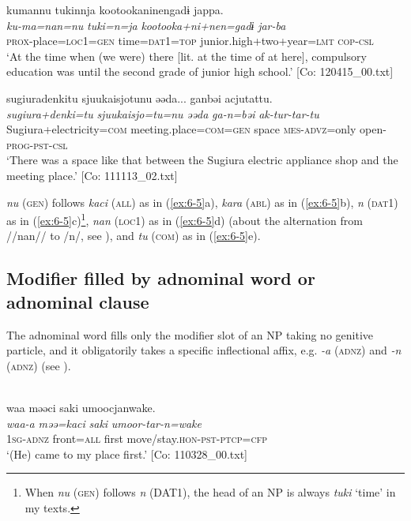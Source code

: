 \ex
{\TM}
\glll kumannu  tukinnja  {\textbar}kootookaninen{\textbar}gadɨ jappa.\\
\textit{ku-ma=nan=nu}  \textit{tuki=n=ja}  \textit{kootooka+ni+nen=gadɨ}   \textit{jar-ba}\\
\textsc{prox}-place=\textsc{loc1}=\textsc{gen}  time=\textsc{dat}1=\textsc{top}  junior.high+two+year=\textsc{lmt}   \textsc{cop}-\textsc{csl}\\
\glt ‘At the time when (we were) there [lit. at the time of at here], compulsory education was until the second grade of junior high school.’ [Co: 120415\_00.txt]

\ex
{\TM}
\glll {\textbar}sugiuradenki{\textbar}tu  {\textbar}sjuukaisjo{\textbar}tunu  əəda...  ganbəi  acjutattu.\\
\textit{sugiura+denki=tu}  \textit{sjuukaisjo=tu=nu}  \textit{əəda}  \textit{ga-n=bəi}  \textit{ak-tur-tar-tu}\\
Sugiura+electricity=\textsc{com}  meeting.place=\textsc{com}=\textsc{gen}  space  \textsc{mes}-\textsc{advz}=only   open-\textsc{prog}-\textsc{pst}-\textsc{csl}\\
\glt ‘There was a space like that between the Sugiura electric appliance shop and the meeting place.’ [Co: 111113\_02.txt]
\z
\z

\textit{nu} (\textsc{gen}) follows \textit{kaci} (\textsc{all}) as in (\ref{ex:6-5}a), \textit{kara} (\textsc{abl}) as in (\ref{ex:6-5}b), \textit{n} (\textsc{dat}1) as in (\ref{ex:6-5}c)\footnote{When \textit{nu} (\textsc{gen}) follows \textit{n} (DAT1), the head of an NP is always \textit{tuki} ‘time’ in my texts.}, \textit{nan} (\textsc{loc1}) as in (\ref{ex:6-5}d) (about the alternation from //nan// to /n/, see ), and \textit{tu} (\textsc{com}) as in (\ref{ex:6-5}e).

\subsection{Modifier filled by adnominal word or adnominal clause}

The adnominal word fills only the modifier slot of an NP taking no genitive particle, and it obligatorily takes a specific inflectional affix, e.g. \textit{-a} (\textsc{adnz}) and \textit{-n} (\textsc{adnz}) (see ).

\ea\label{ex:6-6}
\ea{}\\
{\US}
\glll  waa  məəci  saki  umoocjanwake.\\
\textit{waa-a}  \textit{məə=kaci}  \textit{saki}  \textit{umoor-tar-n=wake}\\
1\textsc{sg}-\textsc{adnz}  front=\textsc{all}  first  move/stay.\textsc{hon}-\textsc{pst}-\textsc{ptcp}=\textsc{cfp}\\
\glt ‘(He) came to my place first.’ [Co: 110328\_00.txt]


